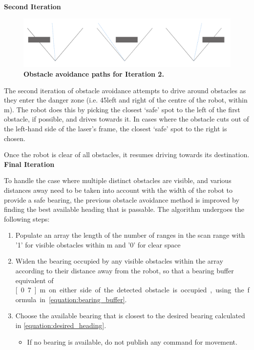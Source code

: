 \documentclass[titlepage,12pt,a4paper]{article}
\begin{document}
\textbf{Second Iteration}

\begin{figure}[h]
	\centering
	\includegraphics[scale=0.17]{figures/obstacle2.png}
	\caption{\textbf{Obstacle avoidance paths for Iteration 2.}}
\end{figure}

The second iteration of obstacle avoidance attempts to drive around obstacles as they enter the danger zone (i.e. 45\degree left and right of the centre of the robot, within \unit[2]{m}). The robot does this by picking the closest `safe' spot to the left of the first obstacle, if possible, and drives towards it. In cases where the obstacle cuts out of the left-hand side of the laser's frame, the closest `safe' spot to the right is chosen. 

Once the robot is clear of all obstacles, it resumes driving towards its destination. \\


\textbf{Final Iteration}

To handle the case where multiple distinct obstacles are visible, and various distances away need to be taken into account with the width of the robot to provide a safe bearing, the previous obstacle avoidance method is improved by finding the best available heading that is passable. The algorithm undergoes the following steps:

\begin{enumerate}
	\item Populate an array the length of the number of ranges in the scan range with '1' for visible obstacles within \unit[3]{m} and '0' for clear space
	\item Widen the bearing occupied by any visible obstacles within the array according to their distance away from the robot, so that a bearing buffer equivalent of \unit[0.7]{m} on either side of the detected obstacle is occupied, using the formula in \eqref{equation:bearing_buffer}.
	\item Choose the available bearing that is closest to the desired bearing calculated in \eqref{equation:desired_heading}.
	\begin{itemize}
		\item If no bearing is available, do not publish any command for movement.
	\end{itemize}
\end{enumerate}
\end{document}
